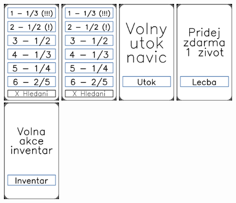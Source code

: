 \documentclass[a4paper]{article}
\begin{document}
	\includegraphics[width=3.0cm]{img-8_6}
	\includegraphics[width=3.0cm]{img-8_7}
	\includegraphics[width=3.0cm]{img-9_0}
	\includegraphics[width=3.0cm]{img-9_1}
	\includegraphics[width=3.0cm]{img-9_2}
\end{document}
